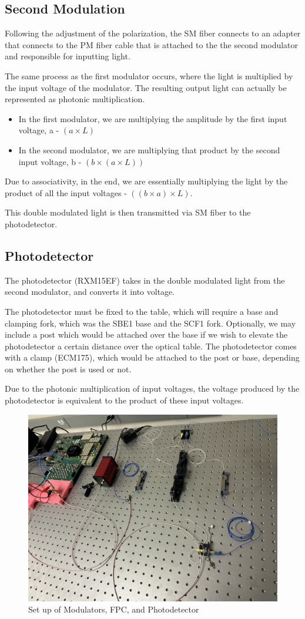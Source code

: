 \documentclass[11pt]{article}
\begin{document}
\subsection{Second Modulation}

Following the adjustment of the polarization, the SM fiber connects to an adapter that connects to the PM fiber cable that is attached to the the second modulator and responsible for inputting light.

The same process as the first modulator occurs, where the light is multiplied by the input voltage of the modulator. The resulting output light can actually be represented as photonic multiplication. 
\begin{itemize}
  \item In the first modulator, we are multiplying the amplitude by the first input voltage, a - $(a \times L)$
  \item In the second modulator, we are multiplying that product by the second input voltage, b - $(b \times (a \times L))$
\end{itemize}
  Due to associativity, in the end, we are essentially multiplying the light by the product of all the input voltages - $((b \times a) \times L)$.

  This double modulated light is then transmitted via SM fiber to the photodetector.

\subsection{Photodetector}

The photodetector (RXM15EF) takes in the double modulated light from the second modulator, and converts it into voltage.

The photodetector must be fixed to the table, which will require a base and clamping fork, which was the SBE1 base and the SCF1 fork. Optionally, we may include a post which would be attached over the base if we wish to elevate the photodetector a certain distance over the optical table. The photodetector comes with a clamp (ECM175), which would be attached to the post or base, depending on whether the post is used or not.

Due to the photonic multiplication of input voltages, the voltage produced by the photodetector is equivalent to the product of these input voltages.

\begin{figure}[H]
    \centering
    \includegraphics[width=0.5\linewidth]{modsandpd.jpg}
    \caption{Set up of Modulators, FPC, and Photodetector}
    \label{fig:enter-label}
\end{figure}
\end{document}
